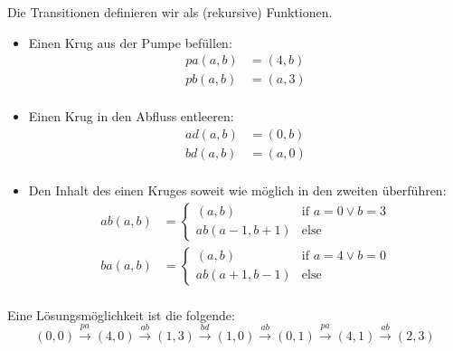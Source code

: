 \documentclass[a4paper]{scrartcl}
\begin{document}
\begin{enumerate}
\begin{enumerate}[label=(\alph*)]
                Die Transitionen definieren wir als (rekursive) Funktionen.
                \begin{itemize}
                    \item Einen Krug aus der Pumpe befüllen:
                        \begin{align*}
                            pa(a,b) &= (4,b) \\
                            pb(a,b) &= (a,3) \\
                        \end{align*}
                    \item Einen Krug in den Abfluss entleeren:
                        \begin{align*}
                            ad(a,b) &= (0,b) \\
                            bd(a,b) &= (a,0) \\
                        \end{align*}
                    \item Den Inhalt des einen Kruges soweit wie möglich in den
                        zweiten überführen:
                        \begin{align*}
                            ab(a,b) &=
                            \begin{cases}
                                (a,b) & \text{if } a = 0 \lor b = 3 \\
                                ab(a-1,b+1) & \text{else}
                            \end{cases} \\
                            ba(a,b) &=
                            \begin{cases}
                                (a,b) & \text{if } a = 4 \lor b = 0 \\
                                ab(a+1,b-1) & \text{else}
                            \end{cases} \\
                        \end{align*}
                \end{itemize}

                Eine Lösungsmöglichkeit ist die folgende:
                \begin{equation*}
                    (0,0)
                    \overset{pa}{\to}
                    (4,0)
                    \overset{ab}{\to}
                    (1,3)
                    \overset{bd}{\to}
                    (1,0)
                    \overset{ab}{\to}
                    (0,1)
                    \overset{pa}{\to}
                    (4,1)
                    \overset{ab}{\to}
                    (2,3)
                \end{equation*}


\end{enumerate}
\end{enumerate}
\end{document}
